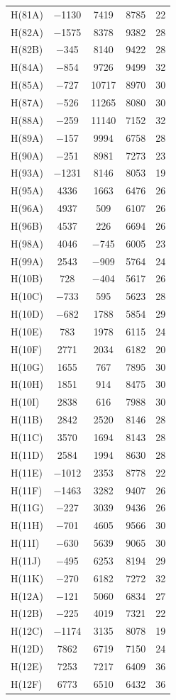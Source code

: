 \begin{center}
{\begin{supertabular}{lcccc}
H(81A)&$-$1130&7419&8785&22\\
H(82A)&$-$1575&8378&9382&28\\
H(82B)&$-$345&8140&9422&28\\
H(84A)&$-$854&9726&9499&32\\
H(85A)&$-$727&10717&8970&30\\
H(87A)&$-$526&11265&8080&30\\
H(88A)&$-$259&11140&7152&32\\
H(89A)&$-$157&9994&6758&28\\
H(90A)&$-$251&8981&7273&23\\
H(93A)&$-$1231&8146&8053&19\\
H(95A)&4336&1663&6476&26\\
H(96A)&4937&509&6107&26\\
H(96B)&4537&226&6694&26\\
H(98A)&4046&$-$745&6005&23\\
H(99A)&2543&$-$909&5764&24\\
H(10B)&728&$-$404&5617&26\\
H(10C)&$-$733&595&5623&28\\
H(10D)&$-$682&1788&5854&29\\
H(10E)&783&1978&6115&24\\
H(10F)&2771&2034&6182&20\\
H(10G)&1655&767&7895&30\\
H(10H)&1851&914&8475&30\\
H(10I)&2838&616&7988&30\\
H(11B)&2842&2520&8146&28\\
H(11C)&3570&1694&8143&28\\
H(11D)&2584&1994&8630&28\\
H(11E)&$-$1012&2353&8778&22\\
H(11F)&$-$1463&3282&9407&26\\
H(11G)&$-$227&3039&9436&26\\
H(11H)&$-$701&4605&9566&30\\
H(11I)&$-$630&5639&9065&30\\
H(11J)&$-$495&6253&8194&29\\
H(11K)&$-$270&6182&7272&32\\
H(12A)&$-$121&5060&6834&27\\
H(12B)&$-$225&4019&7321&22\\
H(12C)&$-$1174&3135&8078&19\\
H(12D)&7862&6719&7150&24\\
H(12E)&7253&7217&6409&36\\
H(12F)&6773&6510&6432&36\\

\end{supertabular}}
\end{center}
